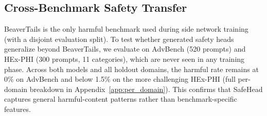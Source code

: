 \documentclass[11pt]{article}
\newcommand{\method}{SafeHead}
\begin{document}
\begin{table}[t]
\centering
\small
{}
\caption{Category exclusion ablation (LLaMA-3, Split~A holdout). Task accuracy is stable across all configurations. Removing instruction-following domains causes harmful rates to spike; other categories are dispensable for safety.}
\label{tab:ablation_data}
\end{table}

\subsection{Cross-Benchmark Safety Transfer}

BeaverTails is the only harmful benchmark used during side network training (with a disjoint evaluation split). To test whether generated safety heads generalize beyond BeaverTails, we evaluate on AdvBench (520 prompts) and HEx-PHI (300 prompts, 11 categories), which are never seen in any training phase. Across both models and all holdout domains, the harmful rate remains at 0\% on AdvBench and below 1.5\% on the more challenging HEx-PHI (full per-domain breakdown in Appendix~\ref{app:per_domain}). This confirms that \method{} captures general harmful-content patterns rather than benchmark-specific features.
\end{document}
